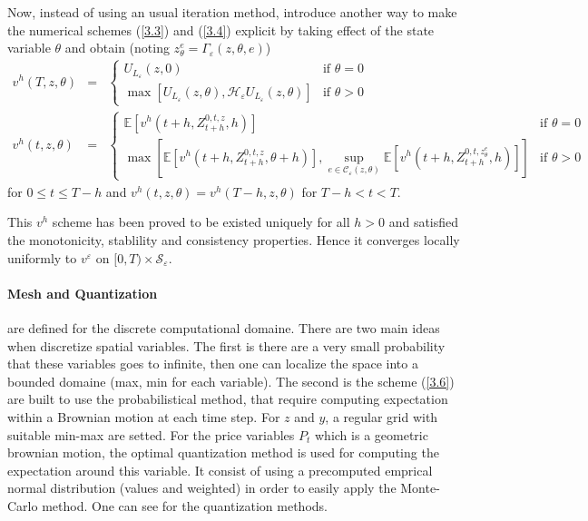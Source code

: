 \documentclass{article}
\begin{document}
\par Now, instead of using an usual iteration method, \cite{GMP} introduce another way to make the numerical schemes (\ref{3.3}) and (\ref{3.4}) explicit by taking effect of the state variable $\theta$ and obtain (noting $z^e_\theta = \Gamma_\varepsilon (z, \theta, e)$)
\begin{eqnarray}
\label{3.5}
{v^h}(T,z,\theta ) &=& \left\{ \begin{array}{ll}
{U_{{L_\varepsilon }}}\left( {z,0} \right) & \textrm{if $\theta = 0$}\\
\max \left[ {{U_{{L_\varepsilon }}}\left( {z,\theta } \right),{\mathcal{H}_\varepsilon }{U_{{L_\varepsilon }}}\left( {z,\theta } \right)} \right] & \textrm{if $\theta > 0$}
\end{array} \right.
\\
\label{3.6}
{v^h}(t,z,\theta ) &=& \left\{ \begin{array}{ll}
\mathbb{E}\left[ {{v^h}\left( {t + h,Z_{t + h}^{0,t,z},h} \right)} \right] & \textrm{if $\theta = 0$}\\
\max \left[ {\mathbb{E}\left[ {{v^h}\left( {t + h,Z_{t + h}^{0,t,z},\theta  + h} \right)} \right],\mathop {\sup }\limits_{e \in {\mathcal{C}_\varepsilon }\left( {z,\theta } \right)} \mathbb{E}\left[ {{v^h}\left( {t + h,Z_{t + h}^{0,t,z_\theta ^e},h} \right)} \right]} \right] & \textrm{if $\theta > 0$}
\end{array} \right.
\end{eqnarray}
for $0 \le t \le T-h$ and $v^h(t,z,\theta) = v^h(T-h,z,\theta) $ for $T-h < t < T$.

\par This $v^h$ scheme has been proved to be existed uniquely for all $h > 0$ and satisfied the monotonicity, stablility and consistency properties. Hence it converges locally uniformly to $v^\varepsilon$ on $[0, T) \times \mathcal{S}_{\varepsilon}$.

\paragraph{Mesh and Quantization} are defined for the discrete computational domaine. There are two main ideas when discretize spatial variables. The first is there are a very small probability that these variables goes to infinite, then one can localize the space into a bounded domaine (max, min for each variable). The second is the scheme (\ref{3.6}) are built to use the probabilistical method, that require computing expectation within a Brownian motion at each time step. For $z$ and $y$, a regular grid with suitable min-max are setted. For the price variables $P_t$ which is a geometric brownian motion, the optimal quantization method is used for computing the expectation around this variable. It consist of using a precomputed emprical normal distribution (values and weighted) in order to easily apply the Monte-Carlo method. One can see \cite{GP}\cite{GPHP} for the quantization methods.    
\end{document}
